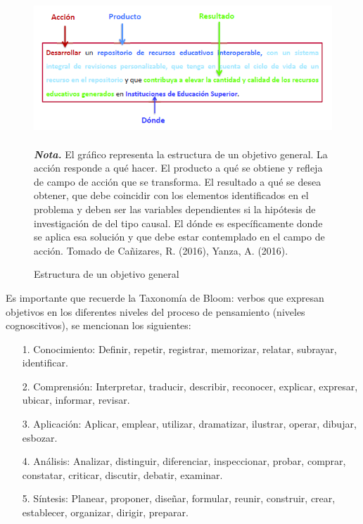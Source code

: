 \documentclass[12pt, a4paper, nofontenc, numbers=endperiod]{apa7}
\begin{document}
{	\begin{figure}[h]
		\caption{Estructura de un objetivo general}
		\label{Figura1} %
		\includegraphics[width=16cm,height=5cm]{Imagenes/Figura12}
			\begin{tablenotes}[para,flushleft]
			{\small
				\textit{\textbf{Nota.}} El gráfico representa la estructura de un objetivo general. La acción responde a qué hacer. El producto a qué se obtiene y refleja de campo de acción que se transforma. El resultado a qué se desea obtener, que debe coincidir con los elementos identificados en el problema y deben ser las variables dependientes si la hipótesis de investigación de del tipo causal. El dónde es específicamente donde se aplica esa solución y que debe estar contemplado en el campo de acción. Tomado de Cañizares, R. (2016), Yanza, A.  (2016).
			}
		\end{tablenotes}
	\end{figure}
	\setlength{\parindent}{1.27cm}Es importante que recuerde la Taxonomía de Bloom: verbos que expresan objetivos en los diferentes niveles del proceso de pensamiento (niveles cognoscitivos), se mencionan los siguientes:
	{\doublespacing
	\begin{itemize}[leftmargin=1.70cm]
		\item[1.]	Conocimiento: Definir, repetir, registrar, memorizar, relatar, subrayar, identificar.
		
		\item[2.]	Comprensión: Interpretar, traducir, describir, reconocer, explicar, expresar, ubicar, informar, revisar.
		
		\item[3.]	Aplicación: Aplicar, emplear, utilizar, dramatizar, ilustrar, operar, dibujar, esbozar.
		
		\item[4.]	Análisis: Analizar, distinguir, diferenciar, inspeccionar, probar, comprar, constatar, criticar, discutir, debatir, examinar.
		
		\item[5.]	Síntesis: Planear, proponer, diseñar, formular, reunir, construir, crear, establecer, organizar, dirigir, preparar.
		

\end{itemize}}}
\end{document}
